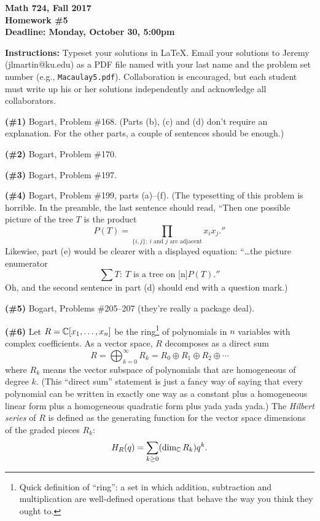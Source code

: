 

\thispagestyle{empty}

\textbf{Math 724, Fall 2017\\
Homework \#5\\
Deadline: Monday, October 30, 5:00pm}

\textbf{Instructions:} Typeset your solutions in LaTeX.  Email your solutions to Jeremy (jlmartin@ku.edu) as a PDF file named with your last name and the problem set number (e.g., {\tt Macaulay5.pdf}).  Collaboration is encouraged, but each student must write up his or her solutions independently and acknowledge all collaborators.

\vfill

\textbf{(\#1)} Bogart, Problem \#168.  (Parts (b), (c) and (d) don't require an explanation.  For the other parts, a couple of sentences should be enough.)

\vfill

\textbf{(\#2)} Bogart, Problem \#170.

\vfill

\textbf{(\#3)} Bogart, Problem \#197.

\vfill

\textbf{(\#4)} Bogart, Problem \#199, parts (a)--(f).  (The typesetting of this problem is horrible.  In the preamble, the last sentence should read, ``Then one possible picture of the tree $T$ is the product
\[P(T) = \prod_{\{i,j\}:\ \text{$i$ and $j$ are adjacent}} x_ix_j.''\]
Likewise, part (e) would be clearer with a displayed equation: ``\dots the picture enumerator
\[\sum{T:\ T\text{ is a tree on [n]}}P(T).''\]
Oh, and the second sentence in part (d) should end with a question mark.)

\vfill

\textbf{(\#5)} Bogart, Problems \#205--207 (they're really a package deal).

\vfill

\textbf{(\#6)} Let $R=\mathbb{C}[x_1,\dots,x_n]$ be the ring\footnote{Quick definition of ``ring'': a set in which addition, subtraction and multiplication are well-defined operations that behave the way you think they ought to.} of polynomials in $n$ variables with complex coefficients.  As a vector space, $R$ decomposes as a direct sum
\[R = \bigoplus_{k=0}^\infty R_k = R_0\oplus R_1\oplus R_2\oplus\cdots\]
where $R_k$ means the vector subspace of polynomials that are homogeneous of degree $k$.  (This ``direct sum'' statement is just a fancy way of saying that every polynomial can be written in exactly one way as a constant plus a homogeneous linear form plus a homogeneous quadratic form plus yada yada yada.)  The \emph{Hilbert series} of $R$ is defined as the generating function for the vector space dimensions of the graded pieces $R_k$:
\[H_R(q)=\sum_{k\geq 0} (\dim_{\mathbb{C}} R_k) q^k.\]

